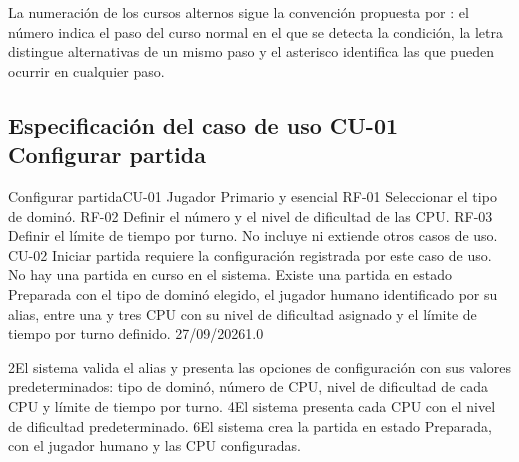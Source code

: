La numeración de los cursos alternos sigue la convención propuesta por \citet{cockburn2001writing}: el número indica el paso del curso normal en el que se detecta la condición, la letra distingue alternativas de un mismo paso y el asterisco identifica las que pueden ocurrir en cualquier paso.

\clearpage
\subsection{Especificación del caso de uso CU-01 Configurar partida}

\encabezadoCU
  {Configurar partida}{CU-01}
  {Jugador}
  {Primario y esencial}
  {RF-01 Seleccionar el tipo de dominó. RF-02 Definir el número y el nivel de dificultad de las CPU. RF-03 Definir el límite de tiempo por turno.}
  {No incluye ni extiende otros casos de uso. CU-02 Iniciar partida requiere la configuración registrada por este caso de uso.}
  {No hay una partida en curso en el sistema.}
  {Existe una partida en estado Preparada con el tipo de dominó elegido, el jugador humano identificado por su alias, entre una y tres CPU con su nivel de dificultad asignado y el límite de tiempo por turno definido.}
  {\Autor}
  {27/09/2026}{1.0 }



\begin{cursonormal}
       {2}{El sistema valida el alias y presenta las opciones de configuración con sus valores predeterminados: tipo de dominó, número de CPU, nivel de dificultad de cada CPU y límite de tiempo por turno.} \filasep
       {4}{El sistema presenta cada CPU con el nivel de dificultad predeterminado.} \filasep
       {6}{El sistema crea la partida en estado Preparada, con el jugador humano y las CPU configuradas.} \filasep
\end{cursonormal}

